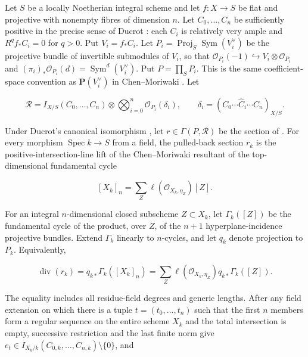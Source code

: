 \begin{theorem}
\label{thm:p171-revised2-complete-resultant}
Let \(S\) be a locally Noetherian integral scheme and let
\(f:X\to S\) be flat and projective with nonempty fibres of dimension
\(n\).  Let \(C_0,\ldots,C_n\) be sufficiently positive in the precise
sense of Ducrot \cite[Section~2.3]{Ducrot97CubeIntersection}: each \(C_i\)
is relatively very ample and
\(R^qf_*C_i=0\) for \(q>0\).  Put \(V_i=f_*C_i\).  Let
\(P_i=\operatorname{Proj}_S\operatorname{Sym}(V_i^\vee)\) be the projective
bundle of invertible submodules of \(V_i\), so that
\(\mathcal O_{P_i}(-1)\hookrightarrow V_i\otimes\mathcal O_{P_i}\) and
\((\pi_i)_*\mathcal O_{P_i}(d)=\operatorname{Sym}^d(V_i^\vee)\).
Put \(P=\prod_SP_i\).  This is the same coefficient-space convention as
\(\mathbf P(V_i^\vee)\) in Chen--Moriwaki
\cite[Section~1.6]{ChenMoriwaki21AdelicIntersection}.  Let

\[
 \mathscr R=I_{X/S}(C_0,\ldots,C_n)\otimes
 \bigotimes_{i=0}^n\mathcal O_{P_i}(\delta_i),
 \qquad
 \delta_i=(C_0\cdots\widehat C_i\cdots C_n)_{X/S}.
\]

Under Ducrot's canonical isomorphism
\cite[Lemma~6.3.1]{Ducrot97CubeIntersection}, let
\(r\in\Gamma(P,\mathscr R)\) be the section of
\cite[Definition~6.3.4]{Ducrot97CubeIntersection}.  For
every morphism \(\operatorname{Spec}k\to S\) from a field, the pulled-back
section \(r_k\) is the positive-intersection-line lift of the
Chen--Moriwaki resultant of the top-dimensional fundamental cycle
\cite[Definitions~1.6.3 and~1.6.7]{ChenMoriwaki21AdelicIntersection}

\[
 [X_k]_n=\sum_Z
 \ell(\mathcal O_{X_k,\eta_Z})[Z].
\]

For an integral \(n\)-dimensional closed subscheme \(Z\subset X_k\), let
\(\Gamma_k([Z])\) be the fundamental cycle of the product, over \(Z\), of
the \(n+1\) hyperplane-incidence projective bundles.  Extend \(\Gamma_k\)
linearly to \(n\)-cycles, and let \(q_k\) denote projection to \(P_k\).
Equivalently,

\begin{equation}
 \operatorname{div}(r_k)
 =q_{k*}\Gamma_k([X_k]_n)
 =\sum_Z\ell(\mathcal O_{X_k,\eta_Z})
   q_{k*}\Gamma_k([Z]).
 \label{eq:p171-revised2-divisor-cycle}
\end{equation}

The equality includes all residue-field degrees and generic lengths.
After any field extension on which there is a tuple
\(t=(t_0,\ldots,t_n)\) such that the first \(n\) members form a regular
sequence on the entire scheme \(X_k\) and the total intersection is empty,
successive restriction and the last finite norm give
\(e_t\in I_{X_k/k}(C_{0,k},\ldots,C_{n,k})\setminus\{0\}\), and


\end{theorem}
